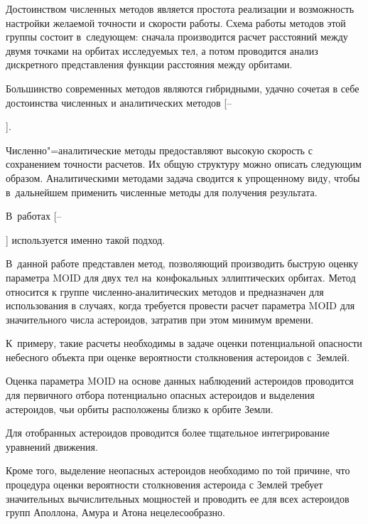 Достоинством численных методов является простота реализации и возможность настройки желаемой точности и скорости работы. Схема работы методов этой группы состоит в~следующем: сначала производится расчет расстояний между двумя точками на орбитах исследуемых тел, а потом проводится анализ дискретного представления функции расстояния между орбитами.



Большинство современных методов являются гибридными, удачно сочетая в себе достоинства численных и аналитических методов [--%


]. 

Численно"=аналитические методы предоставляют высокую скорость с сохранением точности расчетов. Их общую структуру можно описать следующим образом. Аналитическими методами задача сводится к упрощенному виду, чтобы в~дальнейшем применить численные методы для получения результата. 

В~работах [--%


] используется именно такой подход.



В~данной работе представлен метод, позволяющий производить быструю оценку параметра MOID для двух тел на~конфокальных эллиптических орбитах. Метод относится к группе численно-аналитических методов и предназначен для использования в случаях, когда требуется провести расчет параметра MOID для значительного числа астероидов, затратив при этом минимум времени. 

К~примеру, такие расчеты необходимы в задаче оценки потенциальной опасности небесного объекта при оценке вероятности столкновения астероидов с~Землей.



Оценка параметра MOID на основе данных наблюдений астероидов проводится для первичного отбора потенциально опасных астероидов и выделения астероидов, чьи орбиты расположены близко к орбите Земли. 

Для отобранных астероидов проводится более тщательное интегрирование уравнений движения. 

Кроме того, выделение неопасных астероидов необходимо по той причине, что процедура оценки вероятности столкновения астероида с Землей требует значительных вычислительных мощностей и проводить ее для всех астероидов групп Аполлона, Амура и Атона нецелесообразно. 

